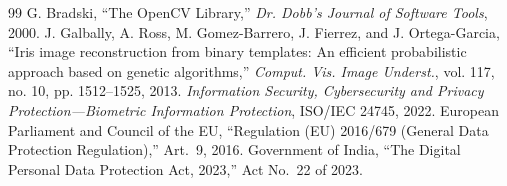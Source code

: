 \documentclass[conference]{IEEEtran}
\begin{document}
\begin{thebibliography}{99}
 G. Bradski, ``The OpenCV Library,'' \textit{Dr. Dobb's Journal of Software Tools}, 2000.
 J. Galbally, A. Ross, M. Gomez-Barrero, J. Fierrez, and J. Ortega-Garcia, ``Iris image reconstruction from binary templates: An efficient probabilistic approach based on genetic algorithms,'' \textit{Comput. Vis. Image Underst.}, vol. 117, no. 10, pp. 1512--1525, 2013.
 \textit{Information Security, Cybersecurity and Privacy Protection---Biometric Information Protection}, ISO/IEC 24745, 2022.
 European Parliament and Council of the EU, ``Regulation (EU) 2016/679 (General Data Protection Regulation),'' Art.~9, 2016.
 Government of India, ``The Digital Personal Data Protection Act, 2023,'' Act No.~22 of 2023.
\end{thebibliography}
\end{document}

